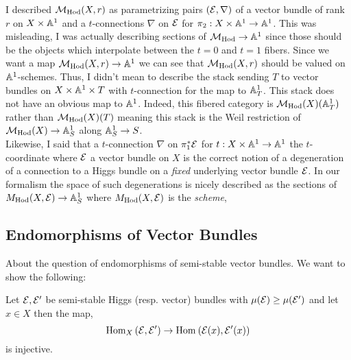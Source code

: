 \documentclass[12pt]{article}
\begin{document}
\begin{rmk}
 I described $\mathcal{M}_{\mathrm{Hod}}(X, r)$ as parametrizing pairs $(\mathcal{E}, \nabla)$ of a vector bundle of rank $r$ on $X \times \mathbb{A}^1$ and a $t$-connections $\nabla$ on $\mathcal{E}$ for $\pi_2 : X \times \mathbb{A}^1 \to \mathbb{A}^1$. This was misleading, I was actually describing sections of $\mathcal{M}_{\mathrm{Hod}} \to \mathbb{A}^1$ since those should be the objects which interpolate between the $t = 0$ and $t = 1$ fibers. Since we want a map $\mathcal{M}_{\mathrm{Hod}}(X, r) \to \mathbb{A}^1$ we can see that $\mathcal{M}_{\mathrm{Hod}}(X, r)$ should be valued on $\mathbb{A}^1$-schemes. Thus, I didn't mean to describe the stack sending $T$ to vector bundles on $X \times \mathbb{A}^1 \times T$ with $t$-connection for the map to $\mathbb{A}^1_T$. This stack does not have an obvious map to $\mathbb{A}^1$. Indeed, this fibered category is $\mathcal{M}_{\mathrm{Hod}}(X)(\mathbb{A}^1_T)$ rather than $\mathcal{M}_{\mathrm{Hod}}(X)(T)$ meaning this stack is the Weil restriction of $\mathcal{M}_{\mathrm{Hod}}(X) \to \mathbb{A}^1_S$ along $\mathbb{A}^1_S \to S$.
\bigskip\\
Likewise, I said that a $t$-connection $\nabla$ on $\pi_1^* \mathcal{E}$ for $t : X \times \mathbb{A}^1 \to \mathbb{A}^1$ the $t$-coordinate where $\mathcal{E}$ a vector bundle on $X$ is the correct notion of a degeneration of a connection to a Higgs bundle on a \textit{fixed} underlying vector bundle $\mathcal{E}$. In our formalism the space of such degenerations is nicely described as the sections of $M_{\mathrm{Hod}}(X, \mathcal{E}) \to \mathbb{A}^1_S$ where $M_{\mathrm{Hod}}(X, \mathcal{E})$ is the \textit{scheme},
\begin{center}
\end{center}
\end{rmk}

\subsection{Endomorphisms of Vector Bundles}

About the question of endomorphisms of semi-stable vector bundles. We want to show the following:

\begin{prop}
Let $\mathcal{E}, \mathcal{E}'$ be semi-stable Higgs (resp. vector) bundles with $\mu(\mathcal{E}) \ge \mu(\mathcal{E}')$ and let $x \in X$ then the map,
\[ \mathrm{Hom}_{X} \left( \mathcal{E}, \mathcal{E}' \right) \to \mathrm{Hom}_{} \left( \mathcal{E}(x), \mathcal{E}'(x) \right) \]
is injective.
\end{prop}
\end{document}
